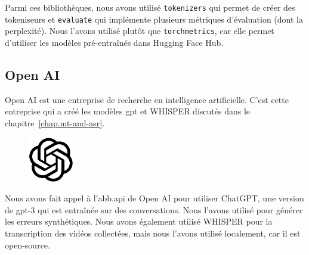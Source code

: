 Parmi ces bibliothèques, nous avons utilisé \verb|tokenizers| qui permet de créer des tokeniseurs
et \verb|evaluate| qui implémente plusieurs métriques d'évaluation (dont la perplexité).
Nous l'avons utilisé plutôt que \verb|torchmetrics|, 
car elle permet d'utiliser les modèles pré-entraînés dans \foreignlanguage{english}{Hugging Face Hub}.

\subsection{\foreignlanguage{english}{Open AI}}
\label{subsec.openai}

\foreignlanguage{english}{Open AI} est une entreprise de recherche en intelligence artificielle.
C'est cette entreprise qui a créé les modèles \gls{gpt} et WHISPER discutés dans le chapitre~\ref{chap.mt-and-asr}.

\begin{figure}
    \vspace*{-\topsep}
    \begin{flushright}
        \includegraphics[width=2cm]{assets/images/openai.png}
    \end{flushright}
\end{figure}

Nous avons fait appel à l'\gls{abb.api} de \foreignlanguage{english}{Open AI} pour utiliser ChatGPT,
une version de \gls{gpt}-3 qui est entraînée sur des conversations.
Nous l'avons utilisé pour générer les erreurs synthétiques.
Nous avons également utilisé WHISPER pour la transcription des vidéos collectées,
mais nous l'avons utilisé localement, car il est open-source.